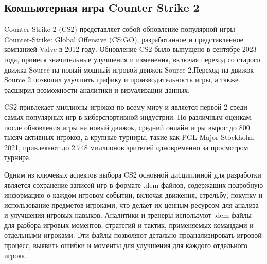 \subsection{Компьютерная игра Counter Strike 2}

Counter-Strike 2 (CS2) представляет собой обновление популярной игры Counter-Strike: Global Offensive (CS:GO), разработанное и представленное компанией Valve в 2012 году. Обновление CS2 было выпущено в сентябре 2023 года, принеся значительные улучшения и изменения, включая переход со старого движка Source на новый мощный игровой движок Source 2.Переход на движок Source 2 позволил улучшить графику и производительность игры, а также расширил возможности аналитики и визуализации данных.

CS2 привлекает миллионы игроков по всему миру и является первой  2 среди самых популярных игр в киберспортивной индустрии. По различным оценкам, после обновления игры на новый движок, средний онлайн игры вырос до 800 тысяч активных игроков, а крупные турниры, такие как PGL Major Stockholm 2021, привлекают до 2.748 миллионов зрителей одновременно за просмотром турнира.

Одним из ключевых аспектов выбора CS2 основной дисциплиной для разработки является сохранение записей игр в формате .dem файлов, содержащих подробную информацию о каждом игровом событии, включая движения, стрельбу, покупку и использование предметов игроками, что делает их ценным ресурсом для анализа и улучшения игровых навыков. Аналитики и тренеры используют .dem файлы для разбора игровых моментов, стратегий и тактик, применяемых командами и отдельными игроками. Эти файлы позволяют детально проанализировать игровой процесс, выявить ошибки и моменты для улучшения для каждого отдельного игрока.

